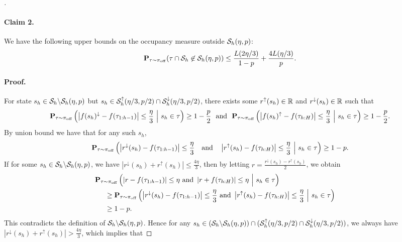 \documentclass{article}
\let\oldparagraph\paragraph
\renewcommand{\paragraph}[1]{\oldparagraph{#1.}}
\begin{document}
\begin{proof}[]
    \paragraph{Claim 2} We have the following upper bounds on the occupancy measure outside $\mathcal{S}_h(\eta, p)$:
    \begin{equation}\label{eq:s-total}
        \mathbf{P}_{\tau\sim \pi_{\mathrm{off}}}(\tau\cap \mathcal{S}_h\not\in \mathcal{S}_h(\eta, p))\le \frac{L(2\eta/3)}{1-p} + \frac{4L(\eta/3)}{p}.
    \end{equation}

    \paragraph{Proof} For state $s_h\in \mathcal{S}_h\backslash \mathcal{S}_h(\eta, p)$ but $s_h\in \mathcal{S}_h^\uparrow(\eta/3, p/2)\cap \mathcal{S}_h^\downarrow(\eta/3, p/2)$, there exists some $r^\uparrow(s_h)\in \mathbb{R}$ and $r^\downarrow(s_h)\in \mathbb{R}$ such that
    \begin{align*} 
        \mathbf{P}_{\tau\sim \pi_{\mathrm{off}}}\left(\left|f(s_h)^\downarrow - f(\tau_{1:h-1})\right|\le \frac{\eta}{3}\ \Big{|}\ s_h\in \tau\right) \ge 1 - \frac{p}{2}\ \ \text{and}\ \ \mathbf{P}_{\tau\sim \pi_{\mathrm{off}}}\left(\left|f(s_h)^\uparrow - f(\tau_{h:H})\right|\le \frac{\eta}{3}\ \Big{|}\ s_h\in \tau\right) \ge 1 - \frac{p}{2}.
    \end{align*}
    By union bound we have that for any such $s_h$,
    \[\mathbf{P}_{\tau\sim \pi_{\mathrm{off}}}\left(\left|r^\downarrow(s_h) - f(\tau_{1:h-1})\right|\le \frac{\eta}{3}\quad  \text{and}\quad  \left|r^\uparrow(s_h) - f(\tau_{h:H})\right|\le \frac{\eta}{3}\ \Big{|}\ s_h\in \tau\right)\ge 1 - p.\]
    If for some $s_h\in \mathcal{S}_h\backslash \mathcal{S}_h(\eta, p)$, we have $|r^\downarrow(s_h) + r^\uparrow(s_h)|\le \frac{4\eta}{3}$, then by letting $r = \frac{r^\downarrow(s_h) - r^\uparrow(s_h)}{2}$, we obtain
    \begin{align*} 
        &\hspace{-0.5cm} \bP_{\tau\sim \pioff}\left(\left|r - f(\tau_{1:h-1})\right|\le \eta\  \text{and}\  \left|r + f(\tau_{h:H})\right|\le \eta\ \Big{|}\ s_h\in \tau\right)\\
        & \ge \bP_{\tau\sim \pioff}\left(\left|r^\downarrow(s_h) - f(\tau_{1:h-1})\right|\le \frac{\eta}{3}\  \text{and}\  \left|r^\uparrow(s_h) - f(\tau_{h:H})\right|\le \frac{\eta}{3}\ \Big{|}\ s_h\in \tau\right)\\
        & \ge 1 - p.
    \end{align*}
    This contradicts the definition of $\mathcal{S}_h\backslash \mathcal{S}_h(\eta, p)$. Hence for any $s_h\in (\mathcal{S}_h\backslash \mathcal{S}_h(\eta, p))\cap (\mathcal{S}_h^\uparrow(\eta/3, p/2)\cap \mathcal{S}_h^\downarrow(\eta/3, p/2))$, we always have $|r^\downarrow(s_h) + r^\uparrow(s_h)| > \frac{4\eta}{3}$, which implies that

\end{proof}
\end{document}
